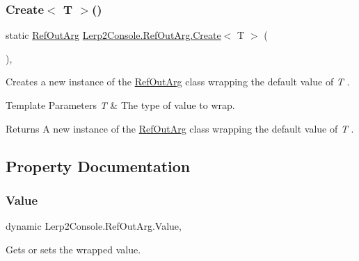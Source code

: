 \subsubsection{\texorpdfstring{Create$<$ T $>$()}{Create< T >()}}
{\footnotesize\ttfamily static \hyperlink{class_lerp2_console_1_1_ref_out_arg}{Ref\+Out\+Arg} \hyperlink{class_lerp2_console_1_1_ref_out_arg_a66bfca7b6fa2e3980651c17711db0e15}{Lerp2\+Console.\+Ref\+Out\+Arg.\+Create}$<$ T $>$ (\begin{DoxyParamCaption}{ }\end{DoxyParamCaption})\hspace{0.3cm}{\ttfamily [inline]}, {\ttfamily [static]}}



Creates a new instance of the \hyperlink{class_lerp2_console_1_1_ref_out_arg}{Ref\+Out\+Arg} class wrapping the default value of {\itshape T} . 


\begin{DoxyTemplParams}{Template Parameters}
{\em T} & The type of value to wrap.\\
\hline
\end{DoxyTemplParams}
\begin{DoxyReturn}{Returns}
A new instance of the \hyperlink{class_lerp2_console_1_1_ref_out_arg}{Ref\+Out\+Arg} class wrapping the default value of {\itshape T} .
\end{DoxyReturn}


\subsection{Property Documentation}
\mbox{\label{class_lerp2_console_1_1_ref_out_arg_a96b201679513e98ee66bd4418a64b7ab}} 
\subsubsection{\texorpdfstring{Value}{Value}}
{\footnotesize\ttfamily dynamic Lerp2\+Console.\+Ref\+Out\+Arg.\+Value\hspace{0.3cm}{\ttfamily [get]}, {\ttfamily [set]}}



Gets or sets the wrapped value. 

\mbox{\label{class_lerp2_console_1_1_ref_out_arg_aaabb1ec3f5ae44dd05434dded84dfc3b}} 
